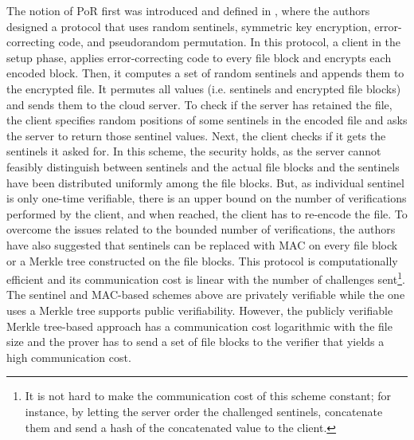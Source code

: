 The notion of PoR first was introduced and defined in \cite{DBLP:conf/ccs/JuelsK07}, where the authors designed a protocol that uses  random sentinels, symmetric key encryption,  error-correcting code, and pseudorandom permutation. In this protocol, a client in the setup phase, applies error-correcting code to every file block and encrypts each encoded block. Then, it computes a set of random sentinels and appends them to the encrypted file. It  permutes all values (i.e. sentinels and encrypted file blocks) and sends them to the cloud  server.  To check if  the server has retained the file, the client specifies  random positions of some sentinels in the encoded file and asks
the server to return those sentinel values. Next, the client checks if it gets the sentinels it asked for. In this scheme, the security holds, as the server cannot feasibly distinguish between sentinels and the actual file blocks and the sentinels have been distributed uniformly among the file blocks. But, as individual sentinel is only one-time verifiable, there is an upper bound on the number of verifications performed by the client, and when reached, the client has to re-encode the file.  To overcome the issues related to the bounded number of verifications, the authors have also suggested that sentinels can be replaced with  MAC on every file block or a Merkle tree constructed on the file blocks. This protocol is computationally efficient and its communication cost is linear with the number of challenges sent\footnote{It is not hard to make the communication cost of this scheme constant; for instance, by letting the server order the challenged sentinels, concatenate them and send a hash of the concatenated value to the client.}. The sentinel and MAC-based schemes above are privately verifiable while the one uses a Merkle tree supports public verifiability. However, the publicly verifiable Merkle tree-based approach has a communication cost logarithmic with the file size and the prover has to send a set of file blocks to the verifier that yields a high communication cost. 


